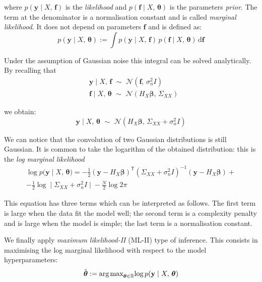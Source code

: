 \noindent
where $p(\mathbf{y}\;\vert\; X,\,\mathbf{f})$ is the \textit{likelihood} and $p(\mathbf{f}\;\vert\; X,\,\boldsymbol{\theta})$ is the parameters \textit{prior}. The term at the denominator is a normalisation constant and is called \textit{marginal likelihood}. It does not depend on parameters $\mathbf{f}$ and is defined as:
\begin{equation}
    p(\mathbf{y}\;\vert\; X,\,\boldsymbol{\theta}) := \int p(\mathbf{y}\;\vert\; X,\,\mathbf{f})\,p(\mathbf{f}\;\vert\; X,\,\boldsymbol{\theta})\,\text{d}\mathbf{f}
\end{equation}

\noindent
Under the assumption of Gaussian noise this integral can be solved analytically. By recalling that
\begin{align}
    &\mathbf{y}\;\vert\; X,\,\mathbf{f}\,\,\sim\,\,\mathcal{N}(\mathbf{f},\,\sigma_n^2I) \\
    &\mathbf{f}\;\vert\; X,\,\boldsymbol{\theta} \,\,\sim\,\,\mathcal{N}(H_{X}\boldsymbol{\beta},\,\Sigma_{XX})
\end{align}

\noindent
we obtain:
\begin{equation}
    \mathbf{y}\;\vert\; X,\,\boldsymbol{\theta}\,\,\sim\,\,\mathcal{N}(H_{X}\boldsymbol{\beta},\,\Sigma_{XX}+\sigma_n^2I)
\end{equation}

\noindent
We can notice that the convolution of two Gaussian distributions is still Gaussian. It is common to take the logarithm of the obtained distribution: this is the \textit{log marginal likelihood}
\begin{equation}\label{eq:logmarginallikelihood}
\begin{split}
    \log{p(\mathbf{y}\;\vert\; X,\,\boldsymbol{\theta}}) = -\frac{1}{2}(\mathbf{y}-H_X\boldsymbol{\beta})^\mathsf{T}(\Sigma_{XX}+\sigma_n^2I)^{-1}(\mathbf{y}-H_X\boldsymbol{\beta}) + \\ -\frac{1}{2}\log{\;\vert\; \Sigma_{XX}+\sigma_n^2I\;\vert\; } - \frac{N}{2}\log{2\pi}
\end{split}
\end{equation}

\noindent
This equation has three terms which can be interpreted as follows. The first term is large when the data fit the model well; the second term is a complexity penalty and is large when the model is simple; the last term is a normalisation constant.

\vspace{0.2cm}
We finally apply \textit{maximum likelihood-II} (ML-II) type of inference. This consists in maximising the log marginal likelihood with respect to the model hyperparameters:
%
\begin{equation}
    \hat{\boldsymbol{\theta}} := \textrm{arg\,max}_{\boldsymbol{\theta}\in\mathbb{R}}{\log{p(\mathbf{y}\;\vert\; X,\,\boldsymbol{\theta})}}
\end{equation}

